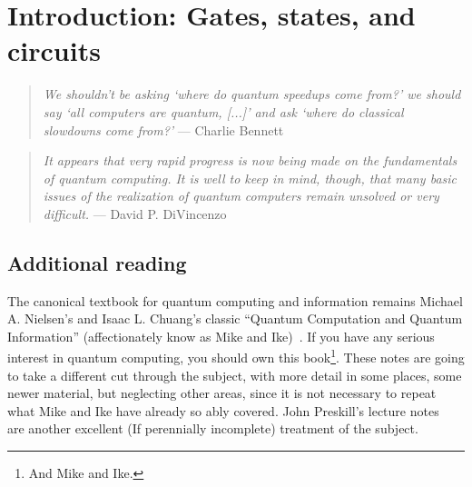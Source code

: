 

\clearpage


\clearpage
\section{Introduction: Gates, states, and circuits}


\begin{quote}
\emph{We shouldn't be asking `where do quantum speedups come from?' we should say `all computers are quantum, [...]' and ask `where do classical slowdowns come from?'} --- Charlie Bennett~\cite{???}
\end{quote}


\begin{quote}
\emph{It appears that very rapid progress is now being made on the fundamentals of quantum computing. It is well to keep in mind, though, that many basic issues of the realization of quantum computers remain unsolved or very difficult.} --- David P. DiVincenzo ~\cite{DiVincenzo1995a}
\end{quote}

%
%
%
%
%
%
%

\subsection{Additional reading}
The canonical textbook for quantum computing and information remains Michael A. Nielsen's and Isaac L. Chuang's   
classic ``Quantum Computation and Quantum Information'' (affectionately know as Mike and Ike)~\cite{Nielsen2000a}.  
If you have any serious interest in quantum computing, you should own this book\footnote{And Mike and Ike.}.
These notes are 
going to take a different cut through the subject, with more detail in some places, some newer material, but neglecting other areas, since it is not necessary to repeat what Mike and Ike have already so ably covered. John Preskill's lecture notes~\cite{PreskillLectureNotes} are another excellent (If perennially incomplete) treatment of the subject.

